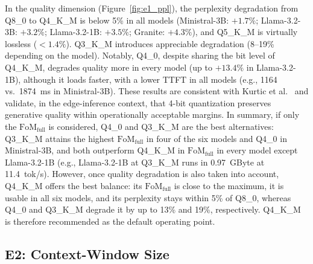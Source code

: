 \documentclass[acmsmall,natbib=false]{acmart}
\begin{document}
In the quality dimension (Figure~\ref{fig:e1_ppl}), the perplexity degradation from
Q8\_0 to Q4\_K\_M is below 5\% in all models (Ministral-3B: $+1.7\%$;
Llama-3.2-3B: $+3.2\%$; Llama-3.2-1B: $+3.5\%$; Granite: $+4.3\%$), and
Q5\_K\_M is virtually lossless ($<1.4\%$). Q3\_K\_M introduces appreciable
degradation (8--19\% depending on the model). Notably, Q4\_0, despite
sharing the bit level of Q4\_K\_M, degrades quality more in every model (up
to $+13.4\%$ in Llama-3.2-1B), although it loads faster, with a lower TTFT
in all models (e.g., 1164 vs.\ 1874~ms in Ministral-3B). These
results are consistent with Kurtic et al.~\cite{kurtic_give_2025} and
validate, in the edge-inference context, that 4-bit quantization preserves
generative quality within operationally acceptable margins. In summary,
if only the $\mathrm{FoM}_{\mathrm{full}}$ is considered, Q4\_0 and Q3\_K\_M are the best alternatives:
Q3\_K\_M attains the highest $\mathrm{FoM}_{\mathrm{full}}$ in four of the six models and Q4\_0 in
Ministral-3B, and both outperform Q4\_K\_M in $\mathrm{FoM}_{\mathrm{full}}$ in every model except
Llama-3.2-1B (e.g., Llama-3.2-1B at Q3\_K\_M runs in 0.97~GByte at
11.4~tok/s). However, once quality degradation is also taken into account,
Q4\_K\_M offers the best balance: its $\mathrm{FoM}_{\mathrm{full}}$ is close to the maximum, it is usable
in all six models, and its perplexity stays within 5\% of Q8\_0, whereas Q4\_0 and
Q3\_K\_M degrade it by up to 13\% and 19\%, respectively. Q4\_K\_M is therefore
recommended as the default operating point.

\subsection{E2: Context-Window Size}\label{sec:results_e2}
\end{document}
